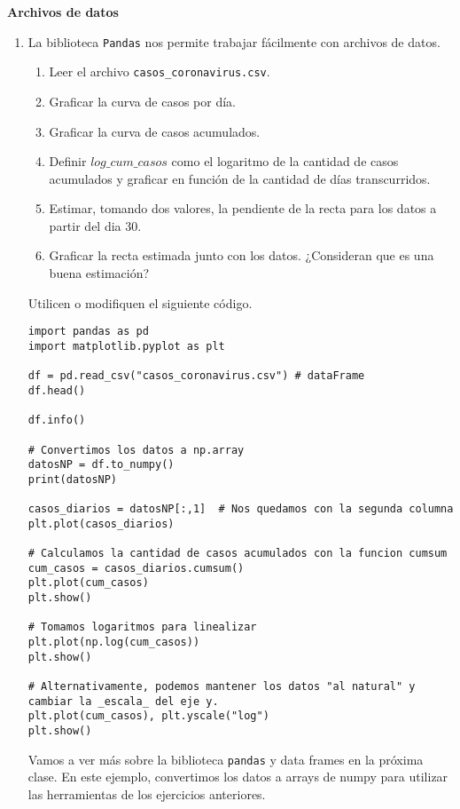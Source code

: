 \documentclass[a4paper,11pt]{article}
\theoremstyle{definition}
\begin{document}
\textbf{\large Archivos de datos}

\begin{enumerate}[resume]
\item La biblioteca \lstinline{Pandas} nos permite trabajar fácilmente con archivos de datos.

\begin{enumerate}
\item Leer el archivo \lstinline{casos_coronavirus.csv}.
\item Graficar la curva de casos por día.
\item Graficar la curva de casos acumulados.
\item Definir $log\_cum\_casos$ como el logaritmo de la cantidad de casos acumulados y graficar en función de la cantidad de días transcurridos.
\item Estimar, tomando dos valores, la pendiente de la recta para los datos a partir del dia 30.
\item Graficar la recta estimada junto con los datos. ¿Consideran que es una buena estimación?
\end{enumerate}

Utilicen o modifiquen el siguiente código.

\begin{lstlisting}
import pandas as pd
import matplotlib.pyplot as plt

df = pd.read_csv("casos_coronavirus.csv") # dataFrame
df.head()

df.info()

# Convertimos los datos a np.array
datosNP = df.to_numpy()
print(datosNP)

casos_diarios = datosNP[:,1]  # Nos quedamos con la segunda columna
plt.plot(casos_diarios)

# Calculamos la cantidad de casos acumulados con la funcion cumsum
cum_casos = casos_diarios.cumsum()
plt.plot(cum_casos)
plt.show()

# Tomamos logaritmos para linealizar
plt.plot(np.log(cum_casos))
plt.show()

# Alternativamente, podemos mantener los datos "al natural" y cambiar la _escala_ del eje y.
plt.plot(cum_casos), plt.yscale("log")
plt.show()
\end{lstlisting}

Vamos a ver más sobre la biblioteca \lstinline{pandas} y data frames en la próxima clase. En este ejemplo, convertimos los datos a arrays de numpy para utilizar las herramientas de los ejercicios anteriores.

\end{enumerate}
\end{document}

